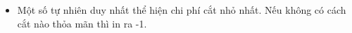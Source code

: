 \begin{itemize}
	\item Một số tự nhiên duy nhất thể hiện chi phí cắt nhỏ nhất. Nếu không có cách cắt nào thỏa mãn thì in ra -1.
\end{itemize}

\